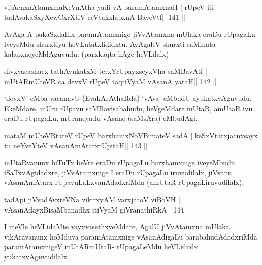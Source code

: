 
\begin{shl}
vijAcnxnAtamxmuKeVnAtha yadi vA paramAtamxnaH |
rUpeV iti tadA\s vakaSxyXcwCxrXtiV ceVtakxlapxnA BaveVtf\hfill || 141 ||
\end{shl}

\begin{artha}
AvAga A pakaSxdalilx paramAtamxnige jiVvAtamxna mUlaka eraDu rUpagaLu
iveyeMdu shurxtiyu heVLutatxlididxtu. AvAgaleV shurxti saMmata
kalapxneyeMdAguvudu. (parxkaqta hAge heVLilalx)
\end{artha}

\begin{shl}
divxvacashacx tathA\s yukatxM terxYrUpayxseyxVha saMBavAtf |
mUtARmUteVR ca devxV rUpeV taqtiVyaM vAsanA yataH\hfill || 142 ||
\end{shl}

\begin{artha}
`devxV' eMba vacanavU (EvakArAthaRda) `vAva' eMbudU ayukatxvAguvudu, EkeMdare, mUru rUpavu saMBavisabahudu, heVgeMdare mUtaR, amUtaR ivu eraDu rUpagaLu, mUraneyadu vAsane (saMsAra) eMbudAgi.
\end{artha}



\begin{shl}
mataM mUteVRtareV rUpeV barxhamxNoV\s BimateV sadA |
keSxVtarxjacnxsayx tu neYveYteV vAsanAmAtarxrUpitaH\hfill || 143 ||
\end{shl}

\begin{artha}
mUtaRvanunx biTuTx beVre eraDu rUpagaLu barxhamxnige iveyeMbudu iSaTxvAgidadxre, jiVvAtamxnige I eraDu rUpagaLu iruvudilalx, jiVvanu vAsanAmAtarx rUpavuLaLxvanAdadxriMda (amUtaR rUpagaLiruvudilalx).
\end{artha}

\begin{shl}
tadA\s pi jiVvadAvxreVNa vikirxyAM varxjatoV viBoVH |
vAsanAdayxBisaMbanadhx itiVyaM giVranathiRkA\hfill || 144 ||
\end{shl}

\begin{artha}
I meVle heVLidaMte vayxvasethxyeMdare, AgalU jiVvAtamxna mUlaka vikAravanunx hoMduva paramAtamxnige vAsanAdigaLu barabahudAdadxriMda paramAtamxnigeV mUtARmUtaR- rUpagaLeMdu heVLidudx yukatxvAguvudilalx.
\end{artha}

